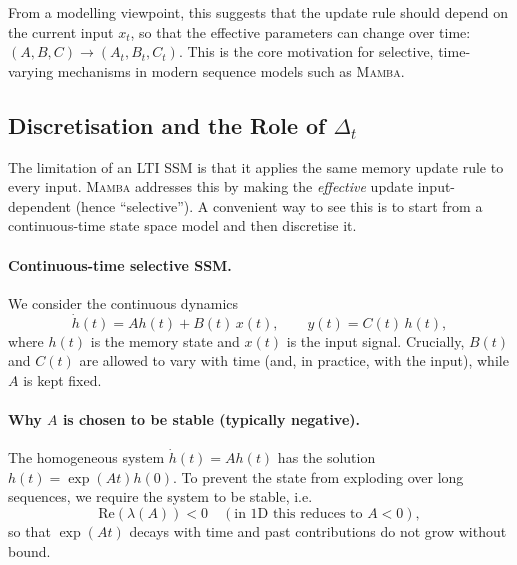 \documentclass[a4paper,11pt]{article}
\begin{document}
From a modelling viewpoint, this suggests that the update rule should depend on the current input $x_t$, so that the effective parameters can change over time: $(A,B,C) \rightarrow (A_t,B_t,C_t)$. This is the core motivation for selective, time-varying mechanisms in modern sequence models such as \textsc{Mamba}.

\subsection{Discretisation and the Role of $\Delta_t$}
\label{app:dt-discretisation}

The limitation of an LTI SSM is that it applies the same memory update rule to every input. 
\textsc{Mamba} addresses this by making the \emph{effective} update input-dependent (hence ``selective''). 
A convenient way to see this is to start from a continuous-time state space model and then discretise it.

\paragraph{Continuous-time selective SSM.}
We consider the continuous dynamics
\begin{equation}
    \dot{h}(t) = A h(t) + B(t)\,x(t), 
    \qquad 
    y(t) = C(t)\,h(t),
    \label{eq:cts_ssm}
\end{equation}
where $h(t)$ is the memory state and $x(t)$ is the input signal.
Crucially, $B(t)$ and $C(t)$ are allowed to vary with time (and, in practice, with the input), while $A$ is kept fixed.

\paragraph{Why $A$ is chosen to be stable (typically negative).}
The homogeneous system $\dot{h}(t)=Ah(t)$ has the solution $h(t)=\exp(At)h(0)$.
To prevent the state from exploding over long sequences, we require the system to be stable, i.e.
\begin{equation}
    \mathrm{Re}(\lambda(A)) < 0
    \quad
    (\text{in 1D this reduces to } A<0),
\end{equation}
so that $\exp(At)$ decays with time and past contributions do not grow without bound.
\end{document}
